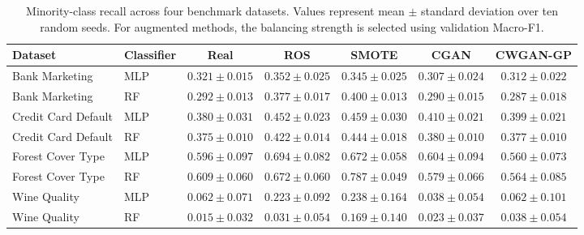 \begin{table}[htbp]
\caption{Minority-class recall across four benchmark datasets. Values represent mean $\pm$ standard deviation over ten random seeds. For augmented methods, the balancing strength is selected using validation Macro-F1.}
\label{tab:supp_minority_recall}
\small
\begin{adjustbox}{max width=\textwidth}
\begin{tabular}{llccccc}
\toprule
Dataset & Classifier & Real & ROS & SMOTE & CGAN & CWGAN-GP \\
\midrule
Bank Marketing & MLP & $0.321\pm0.015$ & $0.352\pm0.025$ & $0.345\pm0.025$ & $0.307\pm0.024$ & $0.312\pm0.022$ \\
Bank Marketing & RF & $0.292\pm0.013$ & $0.377\pm0.017$ & $0.400\pm0.013$ & $0.290\pm0.015$ & $0.287\pm0.018$ \\
Credit Card Default & MLP & $0.380\pm0.031$ & $0.452\pm0.023$ & $0.459\pm0.030$ & $0.410\pm0.021$ & $0.399\pm0.021$ \\
Credit Card Default & RF & $0.375\pm0.010$ & $0.422\pm0.014$ & $0.444\pm0.018$ & $0.380\pm0.010$ & $0.377\pm0.010$ \\
Forest Cover Type & MLP & $0.596\pm0.097$ & $0.694\pm0.082$ & $0.672\pm0.058$ & $0.604\pm0.094$ & $0.560\pm0.073$ \\
Forest Cover Type & RF & $0.609\pm0.060$ & $0.672\pm0.060$ & $0.787\pm0.049$ & $0.579\pm0.066$ & $0.564\pm0.085$ \\
Wine Quality & MLP & $0.062\pm0.071$ & $0.223\pm0.092$ & $0.238\pm0.164$ & $0.038\pm0.054$ & $0.062\pm0.101$ \\
Wine Quality & RF & $0.015\pm0.032$ & $0.031\pm0.054$ & $0.169\pm0.140$ & $0.023\pm0.037$ & $0.038\pm0.054$ \\
\bottomrule
\end{tabular}
\end{adjustbox}
\end{table}
